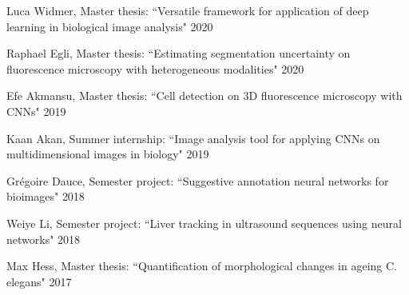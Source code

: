 

\begin{cvhonors}

\cvhonor
{Luca Widmer,}
{Master thesis: ``Versatile framework for application of deep learning in biological image analysis"
}
{2020}
{}

\cvhonor
{Raphael Egli,}
{Master thesis: ``Estimating segmentation uncertainty on fluorescence microscopy with heterogeneous modalities"
}
{2020}
{}

\cvhonor
{Efe Akmansu,}
{Master thesis: ``Cell detection on 3D fluorescence microscopy with CNNs"}
{2019}
{}

\cvhonor
{Kaan Akan,}
{Summer internship: ``Image analysis tool for applying CNNs on multidimensional images in biology"}
{2019}
{}

\cvhonor
{Grégoire Dauce,}
{Semester project: ``Suggestive annotation neural networks for bioimages"}
{2018}
{}

\cvhonor
{Weiye Li,}
{Semester project: ``Liver tracking in ultrasound sequences using neural networks"}
{2018}
{}

\cvhonor
{Max Hess,}
{Master thesis: ``Quantification of morphological changes in ageing C. elegans"}
{2017}
{}

\end{cvhonors}